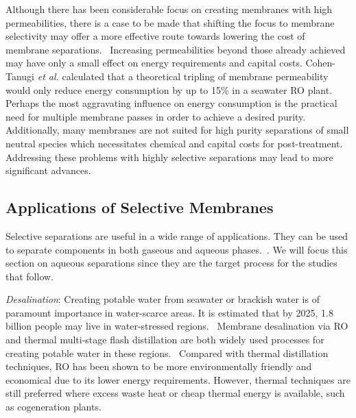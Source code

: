   Although there has been considerable focus on creating membranes with high
  permeabilities, there is a case to be made that shifting the focus to membrane
  selectivity may offer a more effective route towards lowering the cost of 
  membrane separations.~\cite{werber_materials_2016} Increasing permeabilities
  beyond those already achieved may have only a small effect on energy 
  requirements and capital costs. Cohen-Tanugi \textit{et al.} calculated that 
  a theoretical tripling of membrane permeability would only reduce energy 
  consumption by up to 15\% in a seawater RO plant.~\cite{cohen-tanugi_quantifying_2014}
  Perhaps the most aggravating influence on energy consumption is the practical
  need for multiple membrane passes in order to achieve a desired purity.~\cite{singh_production_2009}
  Additionally, many membranes are not suited for high purity separations
  of small neutral species which necessitates chemical and capital costs for
  post-treatment.~\cite{shannon_science_2009,fritzmann_state---art_2007}
  Addressing these problems with highly selective separations may lead to 
  more significant advances.~\cite{deshmukh_desalination_2015}
  
  \subsection{Applications of Selective Membranes}
  
  Selective separations are useful in a wide range of applications. They can be used
  to separate components in both gaseous and aqueous phases.~\cite{baker_gas_2014}. We 
  will focus this section on aqueous separations since they are the target process
  for the studies that follow.
  
  \textit{Desalination}: Creating potable water from seawater or brackish water is of 
  paramount importance in water-scarce areas. It is estimated that by 2025, 1.8 
  billion people may live in water-stressed regions.~\cite{navarro-ortega_managing_2015} %
  Membrane desalination via RO and thermal multi-stage flash distillation are 
  both widely used processes for creating potable water in these regions.~\cite{fritzmann_state---art_2007}
  Compared with thermal distillation techniques, RO has been shown to 
  be more environmentally friendly and economical due to its lower energy
  requirements.\cite{morton_environmental_1997} However, thermal techniques are still
  preferred where excess waste heat or cheap thermal energy is available, such as
  cogeneration plants.\cite{bhojwani_technology_2019}

